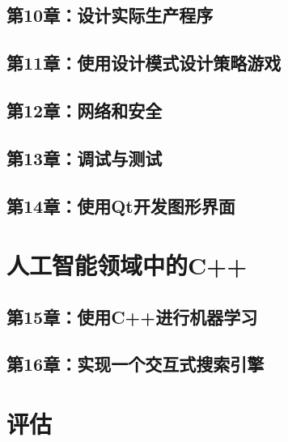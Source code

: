 \documentclass[11pt,a4paper,UTF8]{ctexart}
\begin{document}
		\subsection{第10章：设计实际生产程序}
		
		\subsection{第11章：使用设计模式设计策略游戏}
		
		\subsection{第12章：网络和安全}
		
		\subsection{第13章：调试与测试}
		
		\subsection{第14章：使用Qt开发图形界面}
		
	\section{人工智能领域中的C++}
	
		\subsection{第15章：使用C++进行机器学习}
		
		\subsection{第16章：实现一个交互式搜索引擎}
		
	\section{评估}
	
	
	
	
	
	
	
	
	
	
	
	
	
	
	
	
\end{document}
